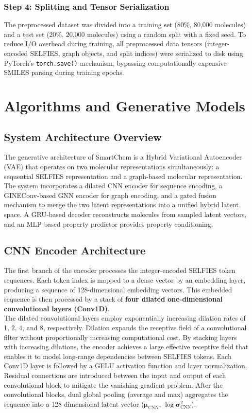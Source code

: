 \documentclass[12pt,a4paper]{report}
\begin{document}
\subsubsection*{Step 4: Splitting and Tensor Serialization}
The preprocessed dataset was divided into a training set (80\%, 80,000 molecules) and a test set (20\%, 20,000 molecules) using a random split with a fixed seed. To reduce I/O overhead during training, all preprocessed data tensors (integer-encoded SELFIES, graph objects, and split indices) were serialized to disk using PyTorch's \texttt{torch.save()} mechanism, bypassing computationally expensive SMILES parsing during training epochs.

\section{Algorithms and Generative Models}

\subsection{System Architecture Overview}

The generative architecture of SmartChem is a Hybrid Variational Autoencoder (VAE) that operates on two molecular representations simultaneously: a sequential SELFIES representation and a graph-based molecular representation. The system incorporates a dilated CNN encoder for sequence encoding, a GINEConv-based GNN encoder for graph encoding, and a gated fusion mechanism to merge the two latent representations into a unified hybrid latent space. A GRU-based decoder reconstructs molecules from sampled latent vectors, and an MLP-based property predictor provides property conditioning. 

\subsection{CNN Encoder Architecture}

The first branch of the encoder processes the integer-encoded SELFIES token sequences. Each token index is mapped to a dense vector by an embedding layer, producing a sequence of 128-dimensional embedding vectors. This embedded sequence is then processed by a stack of \textbf{four dilated one-dimensional convolutional layers (Conv1D)}.\\

The dilated convolutional layers employ exponentially increasing dilation rates of 1, 2, 4, and 8, respectively. Dilation expands the receptive field of a convolutional filter without proportionally increasing computational cost. By stacking layers with increasing dilations, the encoder achieves a large effective receptive field that enables it to model long-range dependencies between SELFIES tokens. Each Conv1D layer is followed by a GELU activation function and layer normalization. Residual connections are introduced between the input and output of each convolutional block to mitigate the vanishing gradient problem. After the convolutional blocks, dual global pooling (average and max) aggregates the sequence into a 128-dimensional latent vector ($\boldsymbol{\mu}_{\text{CNN}}$, $\log \boldsymbol{\sigma}^2_{\text{CNN}}$).
\end{document}
